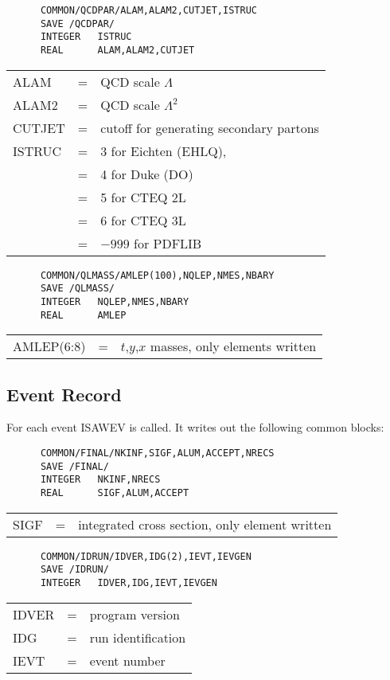 \begin{verbatim}
      COMMON/QCDPAR/ALAM,ALAM2,CUTJET,ISTRUC
      SAVE /QCDPAR/
      INTEGER   ISTRUC
      REAL      ALAM,ALAM2,CUTJET
\end{verbatim}
\begin{tabular}{lcl}
ALAM               &=& QCD scale $\Lambda$\\
ALAM2              &=& QCD scale $\Lambda^2$\\
CUTJET             &=& cutoff for generating secondary partons\\
ISTRUC             &=& 3 for Eichten (EHLQ), \\
                   &=& 4 for Duke (DO) \\
                   &=& 5 for CTEQ 2L\\
                   &=& 6 for CTEQ 3L\\
                   &=& $-999$ for PDFLIB\\
\end{tabular}

\begin{verbatim}
      COMMON/QLMASS/AMLEP(100),NQLEP,NMES,NBARY
      SAVE /QLMASS/
      INTEGER   NQLEP,NMES,NBARY
      REAL      AMLEP
\end{verbatim}
\begin{tabular}{lcl}
AMLEP(6:8)         &=& $t$,$y$,$x$ masses, only elements written\\
\end{tabular}

\subsection{Event Record}

      For each event ISAWEV is called. It writes out the following
common blocks:
\begin{verbatim}
      COMMON/FINAL/NKINF,SIGF,ALUM,ACCEPT,NRECS
      SAVE /FINAL/
      INTEGER   NKINF,NRECS
      REAL      SIGF,ALUM,ACCEPT
\end{verbatim}
\begin{tabular}{lcl}
SIGF              &=& integrated cross section, only element written\\
\end{tabular}

\begin{verbatim}
      COMMON/IDRUN/IDVER,IDG(2),IEVT,IEVGEN
      SAVE /IDRUN/
      INTEGER   IDVER,IDG,IEVT,IEVGEN
\end{verbatim}
\begin{tabular}{lcl}
IDVER              &=& program version\\
IDG                &=& run identification\\
IEVT               &=& event number\\
\end{tabular}

